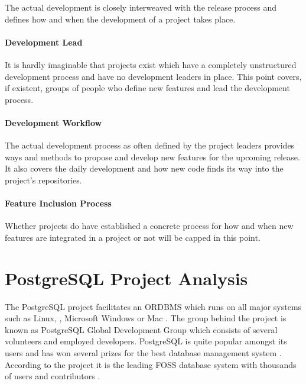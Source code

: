 The actual development is closely interweaved with the release process and
defines how and when the development of a project takes place.

\paragraph{Development Lead}

It is hardly imaginable that projects exist which have a completely
unstructured development process and have no development leaders in place. This
point covers, if existent, groups of people who define new features and lead
the development process.

\paragraph{Development Workflow}

The actual development process as often defined by the project leaders provides
ways and methods to propose and develop new features for the upcoming release.
It also covers the daily development and how new code finds its way into the
project's repositories.

\paragraph{Feature Inclusion Process}

Whether projects do have established a concrete process for how and when new
features are integrated in a project or not will be capped in this point.


\cleardoublepage

\section{PostgreSQL Project Analysis} %


\noindent The PostgreSQL project facilitates an \ac{ORDBMS} which runs on all
major systems such as Linux, , Microsoft Windows or Mac
 \cite{PostgreSQLAbout,PostgreSQLFAQ}. The group behind the
project is known as PostgreSQL Global Development Group which consists of
several volunteers and employed developers. PostgreSQL is quite popular amongst
its users and has won several prizes for the best database management system
\cite{PostgreSQLAwards}. According to the project it is the leading \ac{FOSS}
database system with thousands of users and contributors
\cite{PostgreSQLPressKit}.

